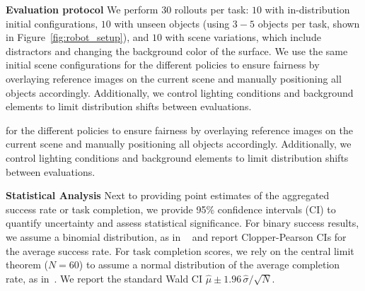 \documentclass[letterpaper, 10 pt, conference]{ieeeconf}  %
\newif\ifappendixincluded
\newcommand{\appendixnote}[1]{\ifappendixincluded#1\fi}
\newcommand{\thomas}[1]{{\color{ForestGreen} TL: #1}}
\begin{document}
\textbf{Evaluation protocol} 
We perform $30$ rollouts per task: $10$ with in-distribution initial configurations, $10$ with unseen objects (using $3-5$ objects per task, shown in Figure~\ref{fig:robot_setup}), and $10$ with scene variations, which include distractors and changing the background color of the surface. %
We use the same initial scene configurations \appendixnote{(cf. Appendix~\ref{sec:appendix-eval-configurations})} for the different policies to ensure fairness by overlaying reference images on the current scene and manually positioning all objects accordingly. Additionally, we control lighting conditions and background elements to limit distribution shifts between evaluations.

for the different policies to ensure fairness by overlaying reference images on the current scene and manually positioning all objects accordingly. Additionally, we control lighting conditions and background elements to limit distribution shifts between evaluations.

\textbf{Statistical Analysis} 
Next to providing point estimates of the aggregated success rate or task completion, we provide 95\% confidence intervals (CI) to quantify uncertainty and assess statistical significance. For binary success results, we assume a binomial distribution, as in ~\cite{barreiros2025LBM-1} 
and report Clopper-Pearson CIs for the average success rate. For task completion scores, we
rely on the central limit theorem ($N=60$) to assume a normal distribution of the average completion rate, as in~\cite{barreiros2025LBM-1}. We report the standard Wald CI $\hat{\mu} \pm 1.96\,\hat{\sigma}/\sqrt{N}$. \appendixnote{Finally, for tables that only include results aggregated over multiple tasks or evaluation scenarios, we report the full results in Appendix~\ref{sec:appendix-detailed-results}.}


\end{document}
